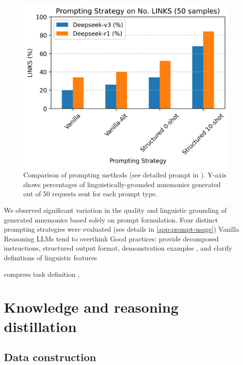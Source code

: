\documentclass[11pt]{article}
\begin{document}
\begin{figure}
  \centering
  \includegraphics[width=\linewidth]{figures/prompt_comparison.png}
  \caption{Comparison of prompting methods (see detailed prompt in ). Y-axis shows percentages of linguistically-grounded mnemonics generated out of 50 requests sent for each prompt type.}
  \label{fig:prompting-methods}
\end{figure}

We observed significant variation in the quality and linguistic grounding of generated mnemonics based solely on prompt formulation. Four distinct prompting strategies were evaluated (see details in \cref{app:prompt-usage})
Vanilla
Reasoning LLMs tend to overthink \citep{xuChainDraftThinking2025}
Good practices: provide decomposed instructions, structured output format, demonstration examples \citep{MishraREFRAMING2022}, and clarify definitions of linguistic features \citep{yinDidYouRead2023}

compress task definition \citep{yinDidYouRead2023},


\section{Knowledge and reasoning distillation}


\subsection{Data construction}
\citep{longLLMsDrivenSyntheticData2024b}
\end{document}
